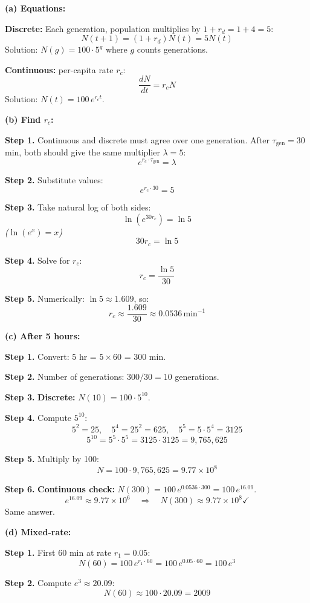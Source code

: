 \documentclass[10pt]{article}
\newcommand{\thus}{\quad\Longrightarrow\quad}
\newcommand{\stepwhy}[1]{\textcolor{blue!60!black}{\small\textit{(#1)}}}
\begin{document}
\begin{solution}
\textbf{(a) Equations:}

\textbf{Discrete:} Each generation, population multiplies by $1+r_d = 1+4 = 5$:
\[
N(t+1) = (1+r_d)N(t) = 5N(t)
\]
Solution: $N(g) = 100\cdot 5^g$ where $g$ counts generations.

\textbf{Continuous:} per-capita rate $r_c$:
\[
\frac{dN}{dt} = r_c N
\]
Solution: $N(t) = 100\,e^{r_c t}$.

\medskip\textbf{(b) Find $r_c$:}

\textbf{Step 1.} Continuous and discrete must agree over one generation. After $\tau_{\text{gen}} = 30$ min, both should give the same multiplier $\lambda = 5$:
\[
e^{r_c\cdot \tau_{\text{gen}}} = \lambda
\]

\textbf{Step 2.} Substitute values:
\[
e^{r_c\cdot 30} = 5
\]

\textbf{Step 3.} Take natural log of both sides:
\[
\ln(e^{30 r_c}) = \ln 5
\]
\stepwhy{$\ln(e^x) = x$}
\[
30 r_c = \ln 5
\]

\textbf{Step 4.} Solve for $r_c$:
\[
r_c = \frac{\ln 5}{30}
\]

\textbf{Step 5.} Numerically: $\ln 5 \approx 1.609$, so:
\[
r_c \approx \frac{1.609}{30} \approx 0.0536\,\text{min}^{-1}
\]

\medskip\textbf{(c) After 5 hours:}

\textbf{Step 1.} Convert: 5 hr = $5\times 60$ = 300 min.

\textbf{Step 2.} Number of generations: $300/30 = 10$ generations.

\textbf{Step 3.} \textbf{Discrete:} $N(10) = 100\cdot 5^{10}$.

\textbf{Step 4.} Compute $5^{10}$:
\[
5^2 = 25, \quad 5^4 = 25^2 = 625, \quad 5^5 = 5\cdot 5^4 = 3125
\]
\[
5^{10} = 5^5\cdot 5^5 = 3125\cdot 3125 = 9{,}765{,}625
\]

\textbf{Step 5.} Multiply by 100:
\[
N = 100\cdot 9{,}765{,}625 = 9.77\times 10^8
\]

\textbf{Step 6.} \textbf{Continuous check:} $N(300) = 100\,e^{0.0536\cdot 300} = 100\,e^{16.09}$.
\[
e^{16.09} \approx 9.77\times 10^6 \thus N(300) \approx 9.77\times 10^8 \checkmark
\]
Same answer.

\medskip\textbf{(d) Mixed-rate:}

\textbf{Step 1.} First 60 min at rate $r_1 = 0.05$:
\[
N(60) = 100\,e^{r_1\cdot 60} = 100\,e^{0.05\cdot 60} = 100\,e^{3}
\]

\textbf{Step 2.} Compute $e^3 \approx 20.09$:
\[
N(60) \approx 100\cdot 20.09 = 2009
\]


\end{solution}
\end{document}
